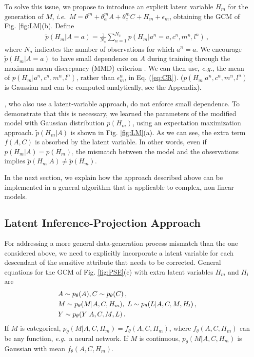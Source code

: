 \documentclass{article}
\newcommand{\figref}[1]{Fig. \ref{#1}}
\renewcommand{\eqref}[1]{Eq. (\ref{#1})}
\newcommand{\ie}{\emph{i.e.}}
\newcommand{\eg}{\emph{e.g.}}
\begin{document}
To solve this issue, we propose to introduce an explicit latent variable $H_m$ for the generation of $M$, \ie~$M=\theta^m+\theta^m_{a}A+\theta^m_{c}C+H_m+\epsilon_m$,
obtaining the GCM of \figref{fig:LM}(b). Define
\begin{align*}
\tilde p(H_m|A=a) = \frac{1}{N_a}\sum_{n=1}^{N_a} p(H_m|a^n=a,c^n,m^n,l^n)\,,
\end{align*}
where $N_a$ indicates the number of observations for which $a^n=a$.
We encourage $\tilde p(H_m|A=a)$ to have small dependence on $A$ during training through the maximum mean discrepancy (MMD) criterion \cite{gretton12kernel}.
We can then use, \eg, the mean of $p(H_m|a^n,c^n,m^n,l^n)$, rather than $\epsilon^n_m$, in \eqref{eq:CR}. ($p(H_m|a^n,c^n,m^n,l^n)$ is Gaussian and can be computed analytically, see the Appendix).

\citet{kusner17counterfactual}, who also use a latent-variable approach, do not enforce small dependence. 
To demonstrate that this is necessary, we learned the parameters of the modified model with Gaussian distribution $p(H_m)$, using an expectation maximization approach. 
$\tilde p(H_m|A)$ is shown in \figref{fig:LM}(a). As we can see, the extra term $f(A,C)$ is absorbed by the latent variable. In other words, even if $p(H_m|A)=p(H_m)$, the mismatch between the model and the observations implies $\tilde p(H_m|A) \neq \tilde p(H_m)$.

In the next section, we explain how the approach described above can be implemented in a general algorithm that is applicable to complex, non-linear models.

\subsection{Latent Inference-Projection Approach\label{sec:lva}}
For addressing a more general data-generation process mismatch than the one considered above, we need to explicitly incorporate a latent variable for each descendant of the sensitive attribute that needs to be corrected. 
General equations for the GCM of \figref{fig:PSE}(c) with extra latent variables $H_m$ and $H_l$ are
\begin{align*}
&A\sim p_{\theta}(A), C \sim p_{\theta}(C)\,,\nonumber\\
&M \sim p_{\theta}(M|A,C,H_m), \hskip0.1cm L \sim p_{\theta}(L|A,C,M,H_l)\,,\\
&Y \sim p_{\theta}(Y|A,C,M,L)\,.
\end{align*}
If $M$ is categorical, $p_{\theta}(M|A,C,H_m)=f_{\theta}(A,C,H_m)$, where $f_{\theta}(A,C,H_m)$ can be any function, \eg~a neural network.
If $M$ is continuous, $p_{\theta}(M|A,C,H_m)$ is Gaussian with mean $f_{\theta}(A,C,H_m)$. 
\end{document}
